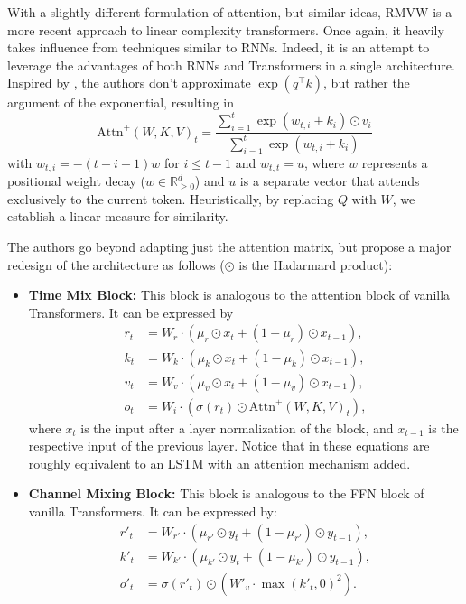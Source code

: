 With a slightly different formulation of attention, but similar ideas, RMVW \cite{Peng2023} is a more recent approach to linear complexity transformers. Once again, it heavily takes influence from techniques similar to RNNs. Indeed, it is an attempt to leverage the advantages of both RNNs and Transformers in a single architecture. Inspired by \cite{Zhai2021}, the authors don't approximate $\exp(q^\top k)$, but rather the argument of the exponential, resulting in
$$
    \text{Attn}^+ (W, K, V)_t = \frac{\sum_{i=1}^t \exp(w_{t, i} + k_i) \odot v_i}{\sum_{i=1}^t \exp(w_{t, i} + k_i)}
$$
with $w_{t, i} = -(t - i - 1)w$ for $i \leq t - 1$ and $w_{t, t} = u$, where $w$ represents a positional weight decay ($w \in \mathbb{R}_{\geq 0}^d$) and $u$ is a separate vector that attends exclusively to the current token. Heuristically, by replacing $Q$ with $W$, we establish a linear measure for similarity.

The authors go beyond adapting just the attention matrix, but propose a major redesign of the architecture as follows ($\odot$ is the Hadarmard product):
\begin{itemize}
    \item \textbf{Time Mix Block:} This block is analogous to the attention block of vanilla Transformers. It can be expressed by 
    \begin{align*}
        r_t &= W_r \cdot (\mu_r \odot x_t + (1 - \mu_r) \odot x_{t-1}), \\ 
        k_t &= W_k \cdot (\mu_k \odot x_t + (1 - \mu_k) \odot x_{t-1}), \\ 
        v_t &= W_v \cdot (\mu_v \odot x_t + (1 - \mu_v) \odot x_{t-1}), \\ 
        o_t &= W_i \cdot (\sigma(r_t) \odot \text{Attn}^+ (W, K, V)_t),
    \end{align*}
    where $x_t$ is the input after a layer normalization of the block, and $x_{t-1}$ is the respective input of the previous layer.
    Notice that in these equations are roughly equivalent to an LSTM with an attention mechanism added.
    \item \textbf{Channel Mixing Block:} This block is analogous to the FFN block of vanilla Transformers. It can be expressed by:
    \begin{align*}
        r'_t &= W_{r'} \cdot (\mu_{r'} \odot y_t + (1 - \mu_{r'}) \odot y_{t-1}), \\ 
        k'_t &= W_{k'} \cdot (\mu_{k'} \odot y_t + (1 - \mu_{k'}) \odot y_{t-1}), \\ 
        o'_t &= \sigma(r'_t) \odot (W'_v \cdot \max(k'_t, 0)^2).
    \end{align*}
\end{itemize}

